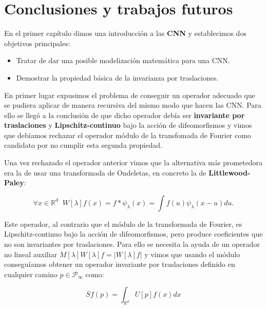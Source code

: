 

\chapter{Conclusiones y trabajos futuros}

\noindent En el primer capítulo dimos una introducción a las \textbf{CNN} y establecimos dos objetivos principales:

\begin{itemize}
  \item Tratar de dar una posible modelización matemática para una CNN.
  \item Demostrar la propiedad básica de la invarianza por traslaciones. 
\end{itemize}


\medskip

\noindent En primer lugar expusimos el problema de conseguir un operador adecuado que se pudiera aplicar de manera recursiva del mismo modo que hacen las CNN. Para ello se llegó a la conclusión de que dicho operador debía ser \textbf{invariante por traslaciones} y \textbf{Lipschitz-continuo} bajo la acción de difeomorfismos y vimos que debíamos rechazar el operador módulo de la transfomada de Fourier como candidato por no cumplir esta segunda propiedad. 

\medskip

\noindent Una vez rechazado el operador anterior vimos que la alternativa más prometedora era la de usar una transformada de Ondeletas, en concreto la de \textbf{Littlewood-Paley}:

\begin{equation}
  \forall x \in  \mathbb{R}^d \;\; W[\lambda]f(x)= f \ast \psi_\lambda(x)=\int f(u)\psi_\lambda(x-u) du .
\end{equation}

\noindent Este operador, al contrario que el módulo de la transformada de Fourier, es Lipschitz-continuo bajo la acción de difeomorfismos, pero produce coeficientes que no son invariantes por traslaciones. Para ello se necesita la ayuda de un operador no lineal auxiliar $M[\lambda]W[\lambda]f=|W[\lambda]f|$ y vimos que usando el módulo conseguíamos obtener un operador invariante por traslaciones definido en cualquier camino $p \in \mathcal{P}_\infty$ como:

\begin{equation}
  \overline{S}f(p)=\int_{\mathbb{R}^d}U[p]f(x)dx 
\end{equation} 

